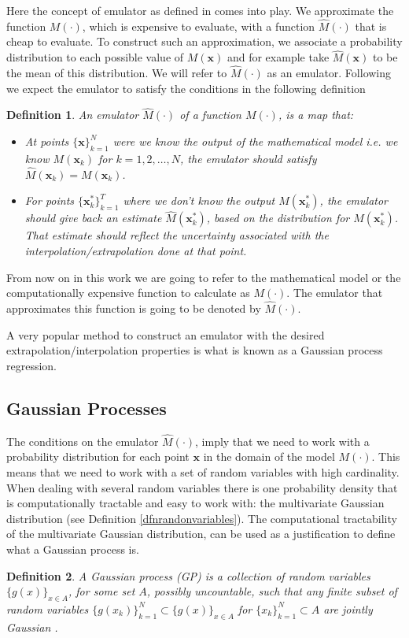 \documentclass[12pt]{book}
\newtheorem{definition}{Definition}
\newcommand{\x}{\textbf{x}}
\begin{document}
Here the concept of emulator as defined in \cite{o2006bayesian} 
comes into play. We 
approximate the function $M(\cdot)$, which is  expensive to evaluate,
 with a function $\widehat{M}(\cdot)$ that is cheap to evaluate. To construct such an approximation,   
we  associate a 
probability distribution to each  possible value of $M(\textbf{x})$ and for example take 
$\widehat{M}(\x)$ to be  the mean
of this distribution. We will refer to $\widehat{M}(\cdot)$ as an emulator. 
Following \cite{o2006bayesian} we expect the emulator to satisfy the conditions in 
the following definition
\begin{definition}\label{dfnEmulator}
An emulator $\widehat{M}(\cdot)$ of a function $M(\cdot)$, is a map that:
\begin{itemize}
\item At points $\{\x\}_{k=1}^{N}$  were we know the output of the mathematical model i.e. we know 
$M(\x_{k})$ for $k=1,2,\ldots, N$,
the emulator should satisfy $\widehat{M}(\x_{k})=M(\x_{k})$.
\item For  points $\{\x_{k}^{*}\}_{k=1}^{T}$ where we don't know the output $M(\x_{k}^{*})$, the emulator should
give back an estimate $\widehat{M}(\textbf{x}_{k}^{*})$, based on the distribution for $M(\textbf{x}_{k}^{*})$. 
That estimate should reflect the uncertainty associated with
the interpolation/extrapolation done at that point.
\end{itemize} 
\end{definition}


From now on in this work we are going to refer to the mathematical model or the computationally expensive
function to calculate as $M(\cdot)$. The emulator that approximates this function is going to be denoted by 
$\widehat{M}(\cdot)$.

A very popular  method to construct an emulator with the desired
extrapolation/interpolation properties is what is known as a Gaussian process regression.  

\subsection{Gaussian Processes}
The conditions on the emulator $\widehat{M}(\cdot)$, imply that we need
to work with a probability distribution for each point $\textbf{x}$ in the domain of the model $M(\cdot)$.
This means that  we need to work with 
 a set of random variables  with high cardinality. 
When dealing with 
several random variables there is one probability density that is computationally tractable and
easy to work with: the multivariate Gaussian distribution (see Definition \ref{dfnrandonvariables}). 
The computational tractability  of the multivariate Gaussian distribution, can be used as a justification
to define what a Gaussian process is.
\begin{definition}\label{dfnGP}
A Gaussian process (GP) is a collection of random variables $\{g(x)\}_{x\in A}$, for some set $A$, 
possibly uncountable,
 such that any finite subset of random variables
 $\{g(x_{k})\}_{k=1}^{N}\subset\{g(x)\}_{x\in A}$ for 
$\{x_{k}\}_{k=1}^{N}\subset A$ are jointly Gaussian
\cite{rasmussen2006gaussian}. 
\end{definition}
\end{document}
